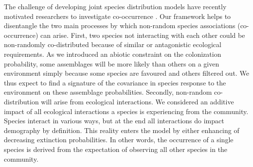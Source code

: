 The challenge of developing joint species distribution models \citep{Pollock2014,Pellissier2013} have recently motivated researchers to investigate co-occurrence \citep{Araujo2014,Veech2013}.
Our framework helps to disentangle the two main processes by which non-random species associations (co-occurrence) can arise. First, two species not interacting with each other could be non-randomly co-distributed because of similar or antagonistic ecological requirements. As we introduced an abiotic constraint on the colonization probability, some assemblages will be more likely than others on a given environment simply because some species are favoured and others filtered out. We thus expect to find a signature of the covariance in species response to the environment on these assemblage probabilities. Secondly, non-random co-distribution will arise from ecological interactions. We considered an additive impact of all ecological interactions a species is experiencing from the community. Species interact in various ways, but at the end all interactions do impact demography by definition. This reality enters the model by either enhancing of decreasing extinction probabilities. In other words, the occurrence of a single species is derived from the expectation of observing all other species in the community.


